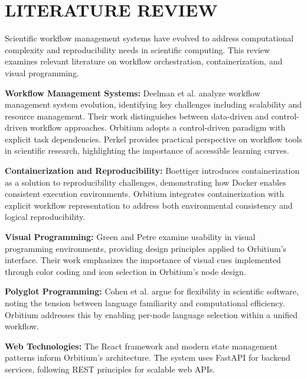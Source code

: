 \documentclass[12pt]{article}
\begin{document}
\newpage
\section{LITERATURE REVIEW}

\hspace{\parindent}Scientific workflow management systems have evolved to address computational complexity and reproducibility needs in scientific computing. This review examines relevant literature on workflow orchestration, containerization, and visual programming.

\hspace{\parindent}\textbf{Workflow Management Systems:} Deelman et al. \cite{deelman2015future} analyze workflow management system evolution, identifying key challenges including scalability and resource management. Their work distinguishes between data-driven and control-driven workflow approaches. Orbitium adopts a control-driven paradigm with explicit task dependencies. Perkel \cite{perkel2019workflow} provides practical perspective on workflow tools in scientific research, highlighting the importance of accessible learning curves.

\hspace{\parindent}\textbf{Containerization and Reproducibility:} Boettiger \cite{boettiger2015introduction} introduces containerization as a solution to reproducibility challenges, demonstrating how Docker enables consistent execution environments. Orbitium integrates containerization with explicit workflow representation to address both environmental consistency and logical reproducibility.

\hspace{\parindent}\textbf{Visual Programming:} Green and Petre \cite{green1996usability} examine usability in visual programming environments, providing design principles applied to Orbitium's interface. Their work emphasizes the importance of visual cues implemented through color coding and icon selection in Orbitium's node design.

\hspace{\parindent}\textbf{Polyglot Programming:} Cohen et al. \cite{cohen2020scientific} argue for flexibility in scientific software, noting the tension between language familiarity and computational efficiency. Orbitium addresses this by enabling per-node language selection within a unified workflow.

\hspace{\parindent}\textbf{Web Technologies:} The React framework and modern state management patterns inform Orbitium's architecture. The system uses FastAPI for backend services, following REST principles for scalable web APIs.
\end{document}
